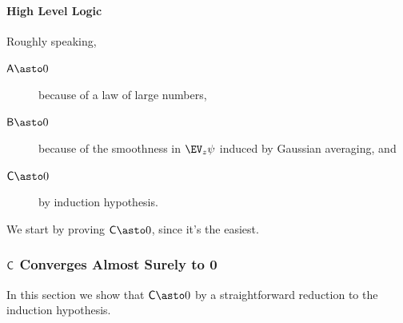 \documentclass[main.tex]{subfiles}
\begin{document}
\paragraph{High Level Logic}
Roughly speaking,
\begin{description}
  \item[$\probA \asto 0$] because of a law of large numbers,
  \item[$\probB \asto 0$] because of the smoothness in $\EV_z \psi$ induced by Gaussian averaging, and
  \item[$\probC \asto 0$] by induction hypothesis.
\end{description}
We start by proving $\probC \asto 0$, since it's the easiest.

\subsubsection{\texorpdfstring{$\mathsf{C}$}{C} Converges Almost Surely to 0}

In this section we show that $\probC \asto 0$ by a straightforward reduction to the induction hypothesis.
\end{document}
